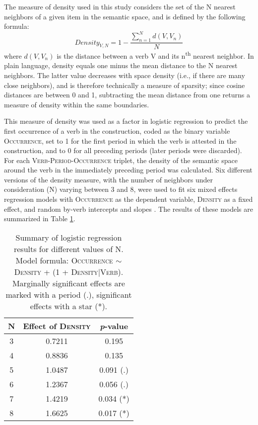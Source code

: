 \documentclass[11pt]{article}
\begin{document}
The measure of density used in this study considers the set of the N nearest neighbors of a given item in the semantic space, and is defined by the following formula: \[Density_{V, N} = 1 - \frac{\sum_{n=1}^{N} d(V, V_{n})}{N}\] where $d(V, V_{n})$ is the distance between a verb V and its n\textsuperscript{th} nearest neighbor. In plain language, density equals one minus the mean distance to the N nearest neighbors. The latter value decreases with space density (i.e., if there are many close neighbors), and is therefore technically a measure of sparsity; since cosine distances are between 0 and 1, subtracting the mean distance from one returns a measure of density within the same boundaries.

This measure of density was used as a factor in logistic regression to predict the first occurrence of a verb in the construction, coded as the binary variable \textsc{Occurrence}, set to 1 for the first period in which the verb is attested in the construction, and to 0 for all preceding periods (later periods were discarded). For each \textsc{Verb}-\textsc{Period}-\textsc{Occurrence} triplet, the density of the semantic space around the verb in the immediately preceding period was calculated. Six different versions of the density measure, with the number of neighbors under consideration (N) varying between 3 and 8, were used to fit six mixed effects regression models with \textsc{Occurrence} as the dependent variable, \textsc{Density} as a fixed effect, and random by-verb intercepts and slopes \cite{BatesEtAl2011}. The results of these models are summarized in Table \ref{regression}.

\begin{table}[ht]
\centering
\begin{tabular}{|c|c|c|}
\hline 
N & Effect of \textsc{Density} & \textit{p}-value \\ 
\hline 
3 & 0.7211 & 0.195 \\ 
4 & 0.8836 & 0.135 \\ 
5 & 1.0487 & 0.091 (.) \\ 
6 & 1.2367 & 0.056 (.) \\ 
7 & 1.4219 & 0.034 (*) \\ 
8 & 1.6625 & 0.017 (*) \\ 
\hline 
\end{tabular} 
\caption{Summary of logistic regression results for different values of N. Model formula: \textsc{Occurrence} $\sim$ \textsc{Density} + (1 + \textsc{Density}$|$\textsc{Verb}). Marginally significant effects are marked with a period (.), significant effects with a star (*).}\label{regression}
\end{table}
\end{document}
